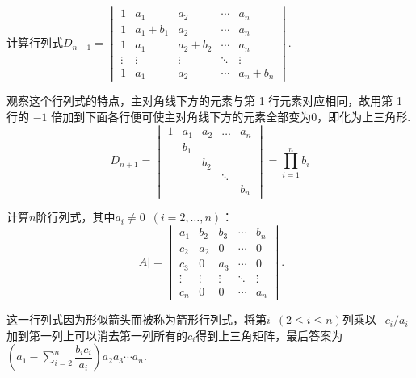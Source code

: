 \begin{example}{}{}
    计算行列式$D_{n+1}=\begin{vmatrix}
            1      & a_{1}       & a_{2}       & \cdots & a_n       \\
            1      & a_{1}+b_{1} & a_{2}       & \cdots & a_n       \\
            1      & a_{1}       & a_{2}+b_{2} & \cdots & a_n       \\
            \vdots & \vdots      & \vdots      & \ddots & \vdots    \\
            1      & a_{1}       & a_{2}       & \cdots & a_n+b_{n}
        \end{vmatrix}$.
\end{example}

\begin{solution}
    观察这个行列式的特点，主对角线下方的元素与第 1 行元素对应相同，故用第 1 行的 $-1$ 倍加到下面各行便可使主对角线下方的元素全部变为0，即化为上三角形.
    \[ D_{n+1}=\begin{vmatrix}
            1 & a_{1} & a_{2} & \ldots & a_n   \\
              & b_{1} &       &        &       \\
              &       & b_{2} &        &       \\
              &       &       & \ddots &       \\
              &       &       &        & b_{n}
        \end{vmatrix}=\prod_{i=1}^n b_i \]
\end{solution}

\begin{example}{}{}
    计算$n$阶行列式，其中$a_i\neq 0\enspace(i=2,\ldots,n)$：
    \[|A|=\begin{vmatrix}
            a_1    & b_2    & b_3    & \cdots & b_n    \\
            c_2    & a_2    & 0      & \cdots & 0      \\
            c_3    & 0      & a_3    & \cdots & 0      \\
            \vdots & \vdots & \vdots & \ddots & \vdots \\
            c_n    & 0      & 0      & \cdots & a_n
        \end{vmatrix}.\]
\end{example}

\begin{solution}
    这一行列式因为形似箭头而被称为箭形行列式，将第$i\enspace(2\leqslant i\leqslant n)$列乘以$-c_i/a_i$加到第一列上可以消去第一列所有的$c_i$得到上三角矩阵，最后答案为$(a_1-\sum\limits_{i=2}^n\dfrac{b_ic_i}{a_i})a_2a_3\cdots a_n$.
\end{solution}

